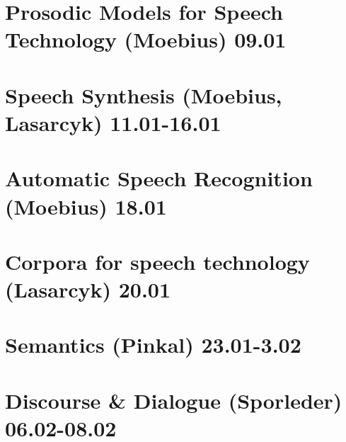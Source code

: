 \documentclass[11pt]{article}
\begin{document}
\section{Prosodic Models for Speech Technology (Moebius) 09.01}

\section{Speech Synthesis (Moebius, Lasarcyk) 11.01-16.01}

\section{Automatic Speech Recognition (Moebius) 18.01}

\section{Corpora for speech technology (Lasarcyk) 20.01}

\section{Semantics (Pinkal) 23.01-3.02}

\section{Discourse \& Dialogue (Sporleder) 06.02-08.02}
\end{document}
